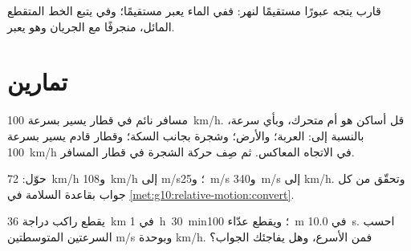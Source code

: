 \begin{omfigure}

{\small قارب يتجه عبورًا مستقيمًا لنهر: ففي  الماء
يعبر مستقيمًا؛ وفي  يتبع الخط المتقطع المائل،
منجرفًا مع الجريان وهو يعبر.}
\end{omfigure}

\section{تمارين}

\begin{exercise}[$\star$]\label{exo:g10:relative-motion:1}
مسافر نائم في قطار يسير بسرعة \qty{100}{km/h}. قل
أساكن هو أم متحرك، وبأي سرعة، بالنسبة إلى: العربة؛ والأرض؛
وشجرة بجانب السكة؛ وقطار قادم يسير بسرعة \qty{100}{km/h} في الاتجاه
المعاكس. ثم صِف حركة الشجرة في  قطار المسافر.
\end{exercise}

\begin{exercise}[$\star$]\label{exo:g10:relative-motion:2}
حوّل: \qty{72}{km/h} و\qty{108}{km/h} إلى \unit{m/s}؛
و\qty{25}{m/s} و\qty{340}{m/s} إلى \unit{km/h}. وتحقّق من كل جواب
بقاعدة السلامة في \cref{met:g10:relative-motion:convert}.
\end{exercise}

\begin{exercise}[$\star$]\label{exo:g10:relative-motion:3}
يقطع راكب دراجة \qty{36}{km} في \qty{1}{h}~\qty{30}{min}؛ ويقطع عدّاء
\qty{100}{m} في \qty{10.0}{s}. احسب السرعتين المتوسطتين 
\unit{m/s} وبوحدة \unit{km/h}. فمن الأسرع، وهل يفاجئك
الجواب؟
\end{exercise}

